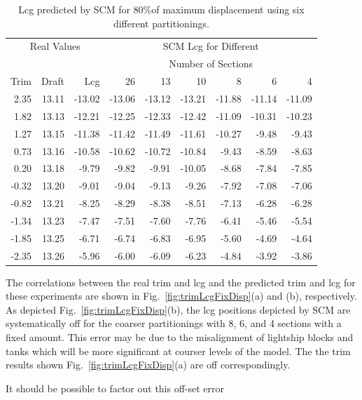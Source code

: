 \documentclass[runningheads]{llncs}
\begin{document}
\begin{table}
\begin{tabular}{rrr|rrrrrr}
\multicolumn{3}{c|}{Real Values}&\multicolumn{6}{c}{SCM Lcg for Different}\\
\multicolumn{3}{c|}{}&\multicolumn{6}{c}{Number of Sections}\\
Trim        & Draft   & Lcg       &26        &13        &10        &8          &6          &4\\
\hline
2.35        &13.11  &-13.02 &-13.06 &-13.12 &-13.21 &-11.88 &-11.14 &-11.09  \\
1.82        &13.13  &-12.21 &-12.25 &-12.33 &-12.42 &-11.09 &-10.31 &-10.23  \\
1.27        &13.15  &-11.38 &-11.42 &-11.49 &-11.61 &-10.27 &-9.48   &-9.43   \\
0.73        &13.16  &-10.58 &-10.62 &-10.72 &-10.84 &-9.43   &-8.59   &-8.63   \\
0.20        &13.18  &-9.79   &-9.82   &-9.91   &-10.05 &-8.68   &-7.84   &-7.85   \\
-0.32      &13.20  &-9.01   &-9.04   &-9.13   &-9.26   &-7.92   &-7.08   &-7.06   \\
-0.82      &13.21  &-8.25   &-8.29   &-8.38   &-8.51   &-7.13   &-6.28   &-6.28   \\
-1.34      &13.23  &-7.47   &-7.51   &-7.60   &-7.76   &-6.41   &-5.46   &-5.54   \\
-1.85      &13.25  &-6.71   &-6.74   &-6.83   &-6.95   &-5.60   &-4.69   &-4.64   \\
-2.35      &13.26  &-5.96   &-6.00   &-6.09   &-6.23   &-4.84   &-3.92   &-3.86   \\
\end{tabular}
\caption{Lcg predicted by SCM for 80\%of maximum displacement using six different partitionings.}
\label{tbl:lcgVarPart}
\end{table}
The correlations between the real trim and lcg and the predicted trim and lcg for these experiments are shown in Fig.~\ref{fig:trimLcgFixDisp}(a) and (b), respectively. As depicted Fig.~\ref{fig:trimLcgFixDisp}(b), the lcg positions depicted by SCM are systematically off for the coarser partitionings with 8, 6, and 4 sections with a fixed amount. This error may be due to the misalignment of lightship blocks and tanks which will be more significant at courser levels of the model. The the trim results shown Fig.~\ref{fig:trimLcgFixDisp}(a) are off correspondingly. 

It should be possible to factor out this off-set error 
\end{document}
